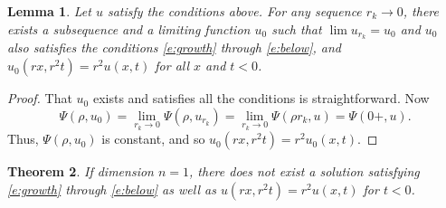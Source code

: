\documentclass{amsart}
\newtheorem{theorem}{Theorem}[section]
\newtheorem{lemma}[theorem]{Lemma}
\numberwithin{equation}{section}
\begin{document}
\begin{lemma} \label{l:blowup2}
 Let $u$ satisfy the conditions above. For any sequence $r_k \to 0$, there exists a subsequence and a limiting function $u_0$ such that $\lim u_{r_k} = u_0$ and $u_0$ also satisfies the conditions \eqref{e:growth} through \eqref{e:below}, and $u_0(rx,r^2t)=r^2u(x,t)$ for all $x$ and $t<0$. 
\end{lemma}

\begin{proof}
 That $u_0$ exists and satisfies all the conditions is straightforward. Now 
 \[
 \Psi(\rho,u_0)= \lim_{r_k \to 0} \Psi(\rho, u_{r_k})= \lim_{r_k \to 0} \Psi (\rho r_k, u)= 
 \Psi(0+,u). 
 \]
 Thus, $\Psi(\rho, u_0)$ is constant, and so $u_0(rx,r^2t)=r^2u_0(x,t)$. 
\end{proof}

\begin{theorem} \label{t:blowup}
 If dimension $n=1$, there does not exist a solution satisfying \eqref{e:growth} through \eqref{e:below} as well as $u(rx,r^2t)=r^2u(x,t)$ for $t<0$. 
\end{theorem}
\end{document}
